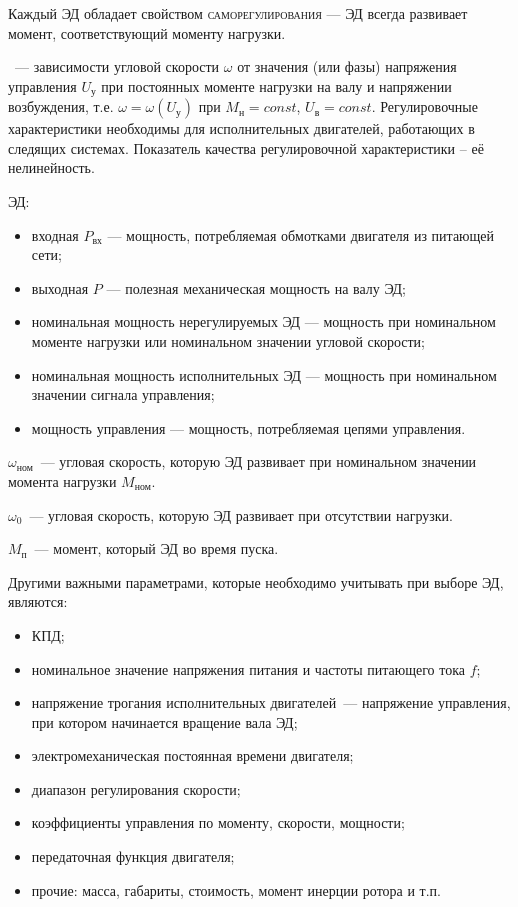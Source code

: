 \documentclass{tufte-book}
\begin{document}
\noindent
Каждый ЭД обладает свойством \textsc{саморегулирования} --- ЭД всегда развивает момент, соответствующий моменту нагрузки.

~--- зависимости угловой скорости $ \omega $ от значения (или фазы) напряжения управления $ U_\text{у} $ при постоянных моменте нагрузки на валу и напряжении возбуждения, т.е. $ \omega = \omega (U_\text{у}) $ при $ M_\text{н} = const $, $ U_\text{в} = const $. Регулировочные характеристики необходимы для исполнительных двигателей, работающих в следящих системах. Показатель качества регулировочной характеристики -- её нелинейность.

 ЭД:
\begin{itemize}
	\item входная $ P_\text{вх} $ --- мощность, потребляемая обмотками двигателя из питающей сети;
	\item выходная $ P $ --- полезная механическая мощность на валу ЭД;
	\item номинальная мощность нерегулируемых ЭД --- мощность при номинальном моменте нагрузки или номинальном значении угловой скорости;
	\item номинальная мощность исполнительных ЭД --- мощность при номинальном значении сигнала управления;
	\item мощность управления --- мощность, потребляемая цепями управления.
\end{itemize}

 $ \omega_\text{ном} $~--- угловая скорость, которую ЭД развивает при номинальном значении момента нагрузки $ M_\text{ном} $.

 $ \omega_0 $~--- угловая скорость, которую ЭД развивает при отсутствии нагрузки.

 $ M_\text{п} $~--- момент, который ЭД во время пуска.

Другими важными параметрами, которые необходимо учитывать при выборе ЭД, являются:
\begin{itemize}
	\item КПД;
	\item номинальное значение напряжения питания и частоты питающего тока $ f $;
	\item напряжение трогания исполнительных двигателей~--- напряжение управления, при котором начинается вращение вала ЭД;
	\item электромеханическая постоянная времени двигателя;
	\item диапазон регулирования скорости;
	\item коэффициенты управления по моменту, скорости, мощности;
	\item передаточная функция двигателя;
	\item прочие: масса, габариты, стоимость, момент инерции ротора и т.п.
\end{itemize}
\end{document}

